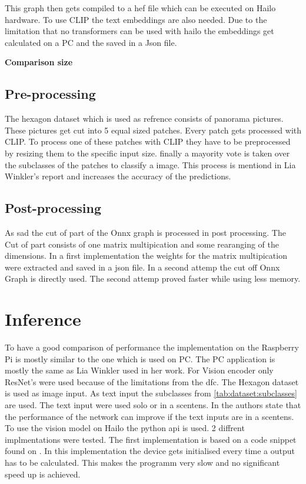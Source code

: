 This graph then gets compiled to a \acrshort{hef} file which can be executed on Hailo hardware.
To use CLIP the text embeddings are also needed.
Due to the limitation that no transformers can be used with hailo the embeddings get calculated on a PC and the saved in a Json file.

\textbf{Comparison size}


\subsection{Pre-processing}

The hexagon dataset which is used as refrence consists of panorama pictures.
These pictures get cut into 5 equal sized patches.
Every patch gets processed with CLIP.
To process one of these patches with CLIP they have to be preprocessed by resizing them to the specific input size.
finally a mayority vote is taken over the subclasses of the patches to classify a image.
This process is mentiond in Lia Winkler's report and increases the accuracy of the predictions.


\subsection{Post-processing}

As sad the cut of part of the Onnx graph is processed in post processing.
The Cut of part consists of one matrix multipication and some rearanging of the dimensions.
In a first implementation the weights for the matrix multipication were extracted and saved in a json file.
In a second attemp the cut off Onnx Graph is directly used.
The second attemp proved faster while using less memory.


\section{Inference}

To have a good comparison of performance the implementation on the Raspberry Pi is mostly similar to the one which is used on PC.
The PC application is mostly the same as Lia Winkler used in her work.
For Vision encoder only ResNet's were used because of the limitations from the \acrshort{dfc}.
The Hexagon dataset is used as image input.
As text input the subclasses from \cref{tab:dataset:subclasses} are used.
The text input were used solo or in a scentens.
In \cite{clip} the authors state that the performance of the network can improve if the text inputs are in a scentens.
To use the vision model on Hailo the python api is used.
2 diffrent implmentations were tested.
The first implementation is based on a code snippet found on \cite{hailoimplementation}.
In this implementation the device gets initialised every time a output has to be calculated.
This makes the programm very slow and no significant speed up is achieved.

